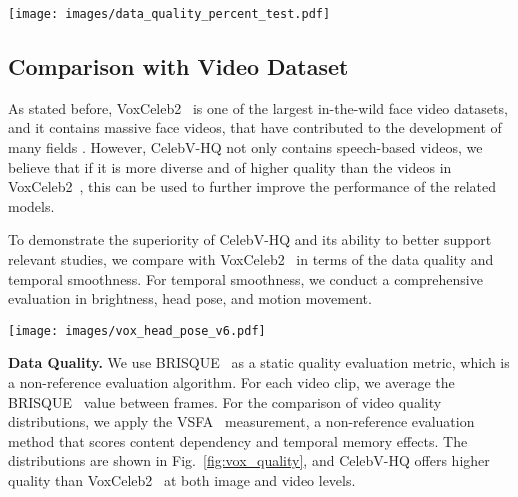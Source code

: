 \documentclass[runningheads]{llncs}
\begin{document}
\begin{figure*}[t]
\centering
\texttt{[image: images/data\_quality\_percent\_test.pdf]}
\caption{\textbf{Distributions of image and video quality, and brightness variance.} (a) Image quality and (b) video quality are measured by BRISQUE~\cite{brisque} and VSFA~\cite{videoquality}, the higher score, the better quality. 
(c) The video brightness is measured by \cite{bezryadin2007brightness}, the low variance reflects the more stable in brightness aspect. 
(d) Samples at different brightness, with brightness values in the upper right corner.}
\label{fig:vox_quality}
\end{figure*}


\subsection{Comparison with Video Dataset}

As stated before, VoxCeleb2~\cite{vox2} is one of the largest in-the-wild face video datasets, and it contains massive face videos, that have contributed to the development of many fields \cite{ephrat2018looking,zhu2021deep,gao2021visualvoice,zhou2019talking,chen2019hierarchical,zhu2021arbitrary,zhou2021pose,ji2021audio}. 
However, CelebV-HQ not only contains speech-based videos, we believe that if it is more diverse and of higher quality than the videos in VoxCeleb2~\cite{vox2}, this can be used to further improve the performance of the related models.

To demonstrate the superiority of CelebV-HQ and its ability to better support relevant studies, we compare with VoxCeleb2~\cite{vox2} in terms of the data quality and temporal smoothness. 
For temporal smoothness, we conduct a comprehensive evaluation in brightness, head pose, and motion movement. 


\begin{figure*}[t]
\centering
\texttt{[image: images/vox\_head\_pose\_v6.pdf]}
\caption{\textbf{Distributions of average head pose and movement range.} There is a wide range of head movement in CelebV-HQ, including both stable videos (less than 20$^{\circ}$ of movement) and videos with significant movement (from 75$^{\circ}$ to 100$^{\circ}$).}
\label{fig:vox_pose}
\end{figure*}



\noindent \textbf{Data Quality. } We use BRISQUE~\cite{brisque} as a static quality evaluation metric, which is a non-reference evaluation algorithm. For each video clip, we average the BRISQUE~\cite{brisque} value between frames. 
For the comparison of video quality distributions, we apply the VSFA~\cite{videoquality} measurement, a non-reference evaluation method that scores content dependency and temporal memory effects. 
The distributions are shown in Fig.~\ref{fig:vox_quality}, and CelebV-HQ offers higher quality than VoxCeleb2~\cite{vox2} at both image and video levels. 
\end{document}

